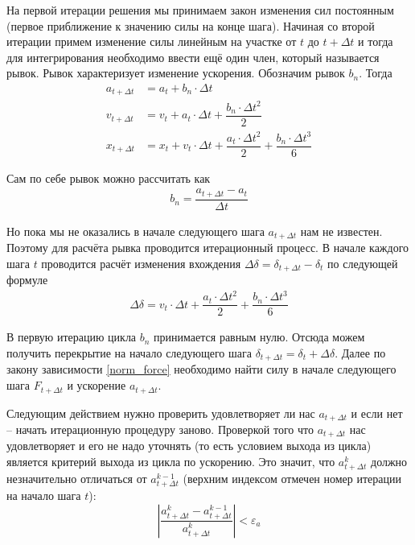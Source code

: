 \documentclass[utf8x, 14pt, oneside, a4paper]{article}
\begin{document}
На первой итерации решения мы принимаем закон изменения сил постоянным (первое приближение к значению силы на конце шага).
Начиная со второй итерации примем изменение силы линейным на участке от $t$ до $t + \Delta t$  и тогда для интегрирования необходимо ввести ещё один член, который называется рывок. 
Рывок характеризует изменение ускорения.
Обозначим рывок $b_n$.
Тогда
\begin{align}
a_{t + \Delta t} &= a_t + b_n \cdot \Delta t \\
v_{t + \Delta t} &= v_t + a_t \cdot \Delta t + \dfrac{b_n \cdot \Delta t^2}{2} \\
x_{t + \Delta t} &= x_t + v_t \cdot \Delta t + \dfrac{a_t \cdot \Delta t^2}{2} +  \dfrac{b_n \cdot \Delta t^3}{6}
\end{align}

Сам по себе рывок можно рассчитать как
\begin{align}
\label{jerk_normal}
b_n = \dfrac{a_{t + \Delta t} - a_{t}}{\Delta t}
\end{align}

Но пока мы не оказались в начале следующего шага $a_{t + \Delta t}$ нам не известен.
Поэтому для расчёта рывка проводится итерационный процесс. 
В начале каждого шага $t$ проводится расчёт изменения вхождения $\Delta \delta = \delta_{t + \Delta t} - \delta_t$ по следующей формуле
\begin{align}
\Delta \delta = v_t \cdot \Delta t + \dfrac{a_t \cdot \Delta t^2}{2} +  \dfrac{b_n \cdot \Delta t^3}{6}
\end{align}

В первую итерацию цикла $b_n$ принимается равным нулю.
Отсюда можем получить перекрытие на начало следующего шага $\delta_{t + \Delta t} = \delta_t + \Delta \delta$.
Далее по закону зависимости \ref{norm_force} необходимо найти силу в начале следующего шага $F_{t + \Delta t}$ и ускорение $a_{t + \Delta t}$.

Следующим действием нужно проверить удовлетворяет ли нас $a_{t + \Delta t}$ и если нет -- начать итерационную процедуру заново.
Проверкой того что $a_{t + \Delta t}$ нас удовлетворяет и его не надо уточнять (то есть условием выхода из цикла) является критерий выхода из цикла по ускорению.
Это значит, что $a_{t + \Delta t}^k$ должно незначительно отличаться от  $a_{t + \Delta t}^{k-1}$ (верхним индексом отмечен номер итерации на начало шага $t$):
\begin{equation}
\label{jerk_condition}
\left| \dfrac{a_{t + \Delta t}^k - a_{t + \Delta t}^{k-1}}{a_{t + \Delta t}^k} \right| < \varepsilon_a
\end{equation}
\end{document}
